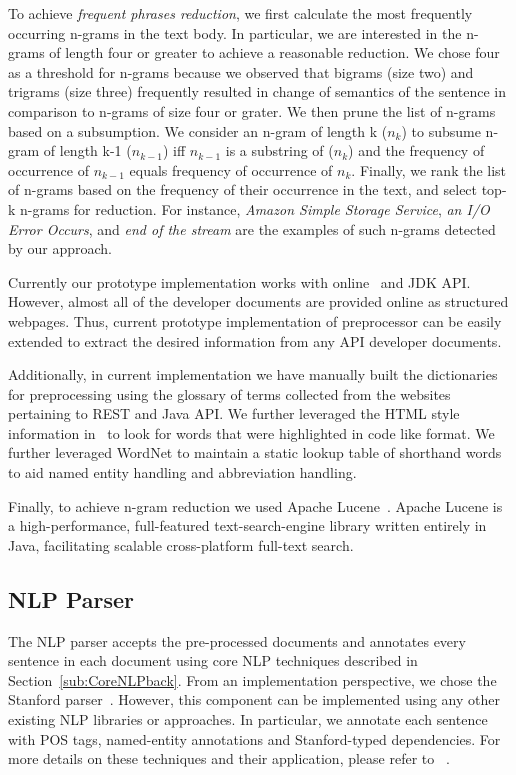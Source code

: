 To achieve \textit{frequent phrases reduction}, we first calculate the most frequently occurring n-grams in the text body. 
In particular, we are interested in the n-grams of length four or greater to achieve a reasonable reduction.
We chose four as a threshold for n-grams because we observed that bigrams (size two) and trigrams (size three) frequently resulted in change of semantics
of the sentence in comparison to n-grams of size four or grater.
We then prune the list of n-grams based on a subsumption. 
We consider an n-gram of length k ($n_k$) to subsume n-gram of length k-1 ($n_{k-1}$) iff $n_{k-1}$ is a substring of ($n_k$) and the frequency of occurrence of $n_{k-1}$ equals frequency of occurrence of $n_{k}$.
Finally, we rank the list of n-grams based on the frequency of their occurrence in the text, and select top-k n-grams for reduction.
For instance, \textit{Amazon Simple Storage Service}, \textit{an I/O Error Occurs}, and \textit{end of the stream} are the examples of such n-grams detected by our approach.


Currently our prototype implementation works with online \amazon\ and JDK API. 
However, almost all of the developer documents are provided online as structured webpages.
Thus, current prototype implementation of preprocessor can be easily extended to extract the desired information from any API developer documents.    

Additionally, in current implementation we have manually built the dictionaries for preprocessing using the glossary of terms collected from the websites pertaining to REST and Java API.
We further leveraged the HTML style information in \amazon\ to look for words that were highlighted in code like format. We further leveraged WordNet to maintain a static lookup table of shorthand words to aid named entity handling and abbreviation handling. 
 
Finally, to achieve  n-gram reduction we used Apache Lucene~\cite{lucene}.
Apache Lucene is a high-performance, full-featured text-search-engine library written entirely in Java,
facilitating scalable cross-platform full-text search. 

\subsection{NLP Parser}


The NLP parser accepts the pre-processed documents and annotates every sentence in each document using core NLP techniques described in Section~\ref{sub:CoreNLPback}.
From an implementation perspective, we chose the Stanford parser~\cite{Manning:01}.
However, this component can be implemented using any other existing NLP libraries or approaches.
In particular, we annotate each sentence with POS tags, named-entity annotations and Stanford-typed dependencies.
For more details on these techniques and their application, please refer to ~\cite{Marneffe06LREC, Marneffe08COLING, pandita12:inferring, pandita13:WHYPER, thummalapentaICSE12}.

